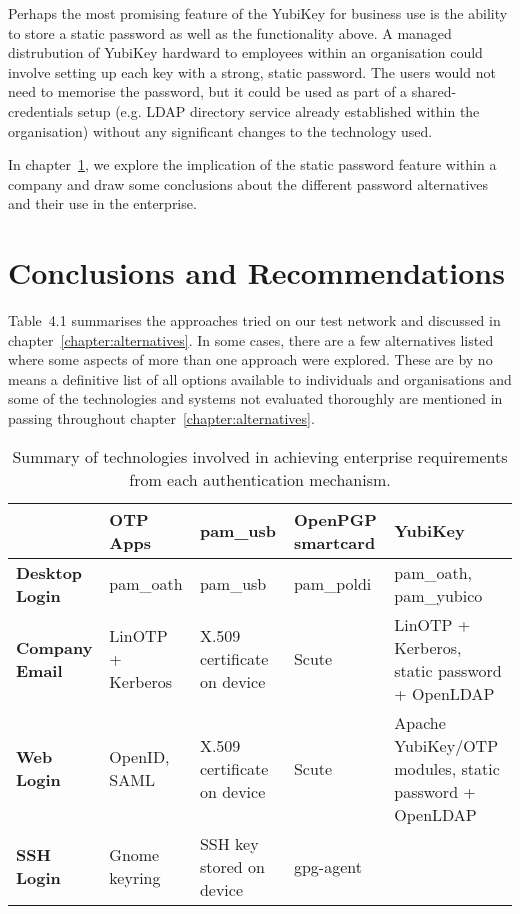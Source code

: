 \documentclass{report}
\begin{document}
Perhaps the most promising feature of the YubiKey for business use is the
ability to store a static password as well as the functionality above. A
managed distrubution of YubiKey hardward to employees within an organisation
could involve setting up each key with a strong, static password. The users
would not need to memorise the password, but it could be used as part of
a shared-credentials setup (e.g. LDAP directory service already established
within the organisation) without any significant changes to the technology
used.

In chapter~\ref{chapter:conclusion}, we explore the implication of the
static password feature within a company and draw some conclusions about the
different password alternatives and their use in the enterprise.

\chapter{Conclusions and Recommendations}
\label{chapter:conclusion}

Table~4.1 summarises the approaches tried on our test network
and discussed in chapter~\ref{chapter:alternatives}. In some cases, there
are a few alternatives listed where some aspects of more than one approach
were explored. These are by no means a definitive list of all options available
to individuals and organisations and some of the technologies and systems
not evaluated thoroughly are mentioned in passing throughout
chapter~\ref{chapter:alternatives}.

\begin{sidewaystable}[p]
\centering
  \begin{tabular}{|l|p{4cm}|p{4cm}|p{4cm}|p{4cm}|} \hline
                            & \textbf{OTP Apps} & \textbf{pam\_usb} & \textbf{OpenPGP smartcard} & \textbf{YubiKey} \\ \hline
    \textbf{Desktop Login}  & pam\_oath        & pam\_usb                    & pam\_poldi & pam\_oath, pam\_yubico  \\ \hline
    \textbf{Company Email}  & LinOTP + Kerberos & X.509 certificate on device & Scute      & LinOTP + Kerberos, static password + OpenLDAP   \\ \hline
    \textbf{Web Login}      & OpenID, SAML     & X.509 certificate on device & Scute      & Apache YubiKey/OTP modules, static password + OpenLDAP  \\ \hline
    \textbf{SSH Login}      & Gnome keyring    & SSH key stored on device    & gpg-agent  &  \\ \hline
  \end{tabular}
  \label{table:overview}
  \caption{Summary of technologies involved in achieving enterprise requirements from each authentication mechanism.}
\end{sidewaystable}
\end{document}
